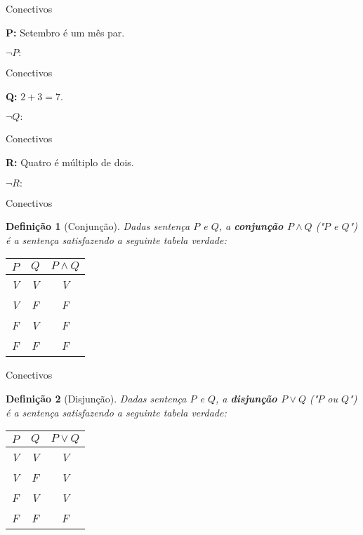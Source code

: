 \documentclass[10pt]{beamer}
\renewcommand{\indent}{\hspace*{2em}}
\theoremstyle{plain}
\newtheorem{defn}{Definição}[section]
\begin{document}
\begin{frame}{Conectivos}
        \begin{block}{}
     \textbf{P:} Setembro é um mês par.
    \end{block}
    $$$$
    $\neg P:$
\end{frame}

\begin{frame}{Conectivos}
        \begin{block}{}
     \textbf{Q:} $2+3=7$.
    \end{block}
    $$$$
    $\neg Q:$
\end{frame}

\begin{frame}{Conectivos}
        \begin{block}{}
     \textbf{R:} Quatro é múltiplo de dois.
    \end{block}
    $$$$
    $\neg R:$
\end{frame}

\begin{frame}{Conectivos}
        \begin{defn}[Conjunção]
        \vfill\indent Dadas sentença $P$ e $Q$, a \textbf{conjunção $P\wedge Q$} ("$P$ e $Q$") é a sentença satisfazendo a seguinte tabela verdade:
        \begin{center}
            \begin{tabular}{|c|c|c|}
    \hline
    $P$ & $Q$  & $P\wedge Q$\\
    \hline
    V & V & V \\
    \hline
    V & F & F \\
    \hline
    F & V & F \\
    \hline
    F & F & F \\
    \hline
\end{tabular}
        \end{center}
    \end{defn}
\end{frame}

\begin{frame}{Conectivos}
        \begin{defn}[Disjunção]
        \vfill\indent Dadas sentença $P$ e $Q$, a \textbf{disjunção $P\vee Q$} ("$P$ ou $Q$") é a sentença satisfazendo a seguinte tabela verdade:
        \begin{center}
            \begin{tabular}{|c|c|c|}
    \hline
    $P$ & $Q$  & $P\vee Q$\\
    \hline
    V & V & V \\
    \hline
    V & F & V \\
    \hline
    F & V & V \\
    \hline
    F & F & F \\
    \hline
\end{tabular}
        \end{center}
    \end{defn}
\end{frame}
\end{document}
